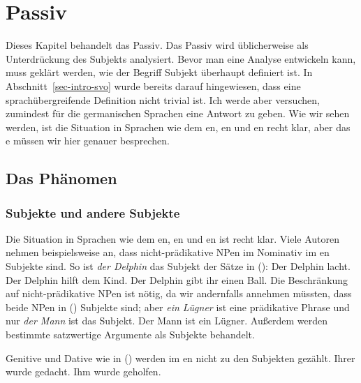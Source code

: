 \chapter{Passiv}
\label{chap-case}


Dieses Kapitel behandelt das Passiv. Das Passiv wird üblicherweise als Unterdrückung des
Subjekts analysiert. Bevor man eine Analyse entwickeln kann, muss geklärt werden, wie der Begriff
Subjekt überhaupt definiert ist. In Abschnitt~\ref{sec-intro-svo} wurde bereits darauf hingewiesen, dass eine
sprachübergreifende Definition nicht trivial ist. Ich werde aber versuchen, zumindest für die germanischen Sprachen
eine Antwort zu geben. Wie wir sehen werden, ist die Situation in Sprachen wie dem en,
en und en recht klar, aber das e müssen wir hier genauer besprechen.

\section{Das Phänomen}

\subsection{Subjekte und andere Subjekte}
\label{sec-subj-properties}
\label{sec-icelandic-quirky-subj}

Die Situation in Sprachen wie dem en, en und en ist recht klar. Viele
Autoren nehmen beispielsweise an, dass nicht-prädikative NPen im Nominativ im en Subjekte sind. So ist \emph{der
  Delphin} das Subjekt der Sätze in ():
\eal
\ex 
Der Delphin lacht.
\ex 
Der Delphin hilft dem Kind.
\ex 
Der Delphin gibt  ihr einen Ball.
\zl
Die Beschränkung auf nicht-prädikative NPen ist nötig, da wir andernfalls annehmen müssten, dass beide
NPen in () Subjekte sind; aber \emph{ein Lügner} ist eine prädikative Phrase und nur
\emph{der Mann} ist das Subjekt.
\ea
Der Mann ist ein Lügner.
\z
Außerdem werden bestimmte satzwertige Argumente als Subjekte behandelt.

Genitive und Dative wie in () werden im en nicht zu den Subjekten gezählt.
\eal
\ex 
Ihrer       wurde gedacht.
\ex 
Ihm       wurde  geholfen.
\zl

